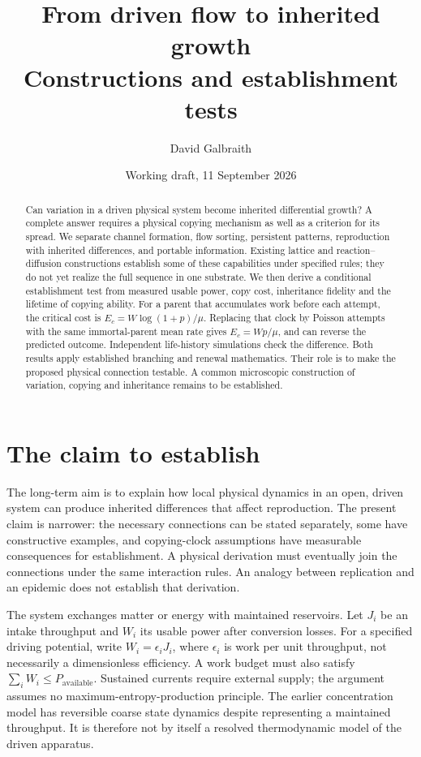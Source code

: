 \documentclass[11pt,a4paper]{article}
\title{From driven flow to inherited growth\\[.3em]\large Constructions and establishment tests}
\author{David Galbraith}
\date{Working draft, 11 September 2026}
\begin{document}
\maketitle
\begin{abstract}
Can variation in a driven physical system become inherited differential growth?
A complete answer requires a physical copying mechanism as well as a criterion
for its spread. We separate channel formation, flow sorting, persistent patterns,
reproduction with inherited differences, and portable information. Existing
lattice and reaction--diffusion constructions establish some of these capabilities
under specified rules; they do not yet realize the full sequence in one substrate.
We then derive a conditional establishment test from measured usable power,
copy cost, inheritance fidelity and the lifetime of copying ability. For a parent
that accumulates work before each attempt, the critical cost is
$E_c=W\log(1+p)/\mu$. Replacing that clock by Poisson attempts with the same
immortal-parent mean rate gives $E_c=Wp/\mu$, and can reverse the predicted outcome.
Independent life-history simulations check the difference. Both results apply
established branching and renewal mathematics. Their role is to make the proposed
physical connection testable. A common microscopic construction of variation,
copying and inheritance remains to be established.
\end{abstract}

\section{The claim to establish}

The long-term aim is to explain how local physical dynamics in an open, driven
system can produce inherited differences that affect reproduction. The present
claim is narrower: the necessary connections can be stated separately, some have
constructive examples, and copying-clock assumptions have measurable consequences
for establishment. A physical derivation must eventually join the connections
under the same interaction rules. An analogy between replication and an epidemic
does not establish that derivation.

The system exchanges matter or energy with maintained reservoirs. Let $J_i$ be
an intake throughput and $W_i$ its usable power after conversion losses. For a
specified driving potential, write $W_i=\epsilon_i J_i$, where $\epsilon_i$ is work
per unit throughput, not necessarily a dimensionless efficiency. A work budget
must also satisfy $\sum_i W_i\le P_{\mathrm{available}}$. Sustained currents require
external supply; the argument assumes no maximum-entropy-production principle.
The earlier concentration model has reversible coarse state dynamics despite
representing a maintained throughput. It is therefore not by itself a resolved
thermodynamic model of the driven apparatus.
\end{document}
